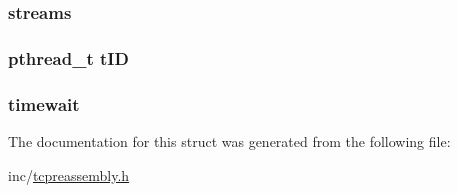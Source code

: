 \hypertarget{struct__tcp__session___a5675d32788db8bd40535c108977e8560}{
\subsubsection[{streams}]{ streams}}\label{struct__tcp__session___a5675d32788db8bd40535c108977e8560}
\hypertarget{struct__tcp__session___ab10186c154259d2b4ed2d25b7e23ed17}{
\subsubsection[{t\-I\-D}]{\setlength{\rightskip}{0pt plus 5cm}pthread\-\_\-t t\-I\-D}}\label{struct__tcp__session___ab10186c154259d2b4ed2d25b7e23ed17}
\hypertarget{struct__tcp__session___a6d12e7905e23f6fd93efd111d40af43c}{
\subsubsection[{timewait}]{ timewait}}\label{struct__tcp__session___a6d12e7905e23f6fd93efd111d40af43c}


The documentation for this struct was generated from the following file\-:\begin{DoxyCompactItemize}
\item 
inc/\hyperlink{tcpreassembly_8h}{tcpreassembly.\-h}\end{DoxyCompactItemize}
